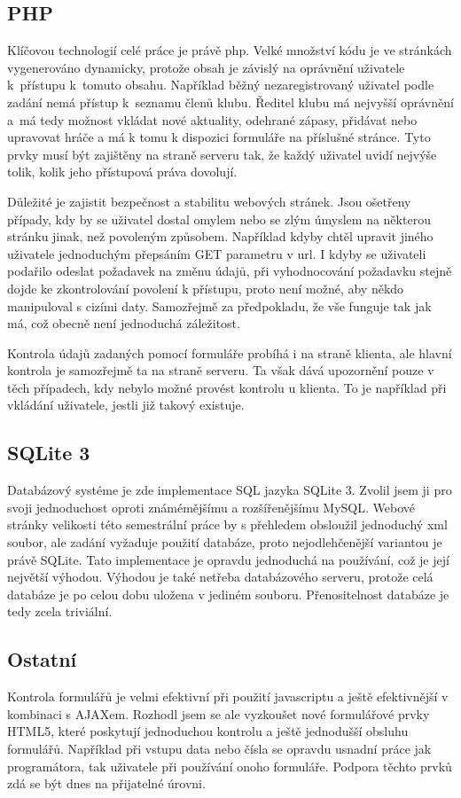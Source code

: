 \documentclass[12pt]{article}
\begin{document}
\subsection{PHP}
Klíčovou technologií celé práce je právě php. Velké množství kódu je ve
stránkách vygenerováno dynamicky, protože obsah je závislý na oprávnění
uživatele k~přístupu k~tomuto obsahu. Například běžný nezaregistrovaný uživatel
podle zadání nemá přístup k~seznamu členů klubu. Ředitel klubu má nejvyšší
oprávnění a~má tedy možnost vkládat nové aktuality, odehrané zápasy, přidávat
nebo upravovat hráče a má k tomu k dispozici formuláře na příslušné stránce.
Tyto prvky musí být zajištěny na straně serveru tak, že každý uživatel uvidí
nejvýše tolik, kolik jeho přístupová práva dovolují.

Důležité je zajistit bezpečnost a stabilitu webových stránek. Jsou ošetřeny
případy, kdy by se uživatel dostal omylem nebo se zlým úmyslem na některou
stránku jinak, než povoleným způsobem. Například kdyby chtěl upravit jiného
uživatele jednoduchým přepsáním GET parametru v url. I kdyby se uživateli
podařilo odeslat požadavek na změnu údajů, při vyhodnocování požadavku stejně
dojde ke zkontrolování povolení k přístupu, proto není možné, aby někdo
manipuloval s cizími daty. Samozřejmě za předpokladu, že vše funguje tak jak
má, což obecně není jednoduchá záležitost.

Kontrola údajů zadaných pomocí formuláře probíhá i na straně klienta,
ale hlavní kontrola je samozřejmě ta na straně serveru. Ta však dává upozornění
pouze v těch případech, kdy nebylo možné provést kontrolu u klienta. To je
například při vkládání uživatele, jestli již takový existuje.

\subsection{SQLite 3}
Databázový systéme je zde implementace SQL jazyka SQLite 3. Zvolil jsem ji pro
svoji jednoduchost oproti známémějšímu a rozšířenějšímu MySQL. Webové stránky
velikosti této semestrální práce by s přehledem obsloužil jednoduchý xml
soubor, ale zadání vyžaduje použití databáze, proto nejodlehčenější variantou
je právě SQLite. Tato implementace je opravdu jednoduchá na používání, což je
její největší výhodou. Výhodou je také netřeba databázového serveru, protože
celá databáze je po celou dobu uložena v jediném souboru. Přenositelnost
databáze je tedy zcela triviální.

\subsection{Ostatní}
Kontrola formulářů je velmi efektivní při použití javascriptu a ještě
efektivnější v kombinaci s AJAXem. Rozhodl jsem se ale vyzkoušet nové
formulářové prvky HTML5, které poskytují jednoduchou kontrolu a ještě
jednodušší obsluhu formulářů. Například při vstupu data nebo čísla se opravdu
usnadní práce jak programátora, tak uživatele při používání onoho formuláře.
Podpora těchto prvků zdá se být dnes na přijatelné úrovni.
\end{document}
